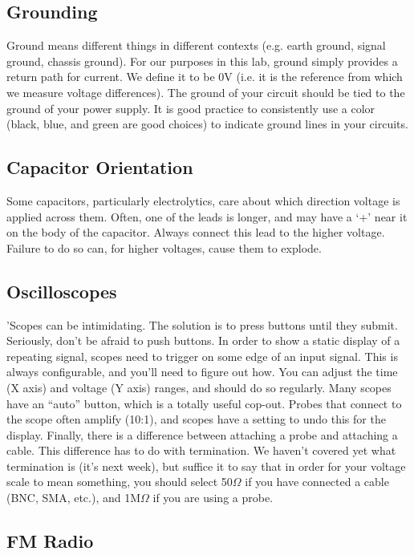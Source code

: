 \documentclass[11pt]{article}
\begin{document}
\subsection*{Grounding}

Ground means different things in different contexts (e.g. earth ground, signal ground,
chassis ground).  For our purposes in
this lab, ground simply provides a return path for current.  We define it to be
0V (i.e. it is the reference from which we measure voltage differences).  The
ground of your circuit should be tied to the ground of your power supply.  It
is good practice to consistently use a color (black, blue, and green are good
choices) to indicate ground lines in your circuits.

\subsection*{Capacitor Orientation}

Some capacitors, particularly electrolytics, care about which direction voltage
is applied across them.  Often, one of the leads is longer, and may have a `+'
near it on the body of the capacitor.  Always connect this lead to the higher voltage.
Failure to do so can, for higher voltages, cause them to explode.

\subsection*{Oscilloscopes}

'Scopes can be intimidating.  The solution is to press buttons until they submit.  Seriously, don't be afraid
to push buttons.  In order to show a static display of a repeating signal, scopes need to trigger on
some edge of an input signal.  This is always configurable, and you'll need to figure out how.  You can
adjust the time (X axis) and voltage (Y axis) ranges, and should do so regularly.  Many scopes have an ``auto''
button, which is a totally useful cop-out.  Probes that connect to the scope often amplify
(10:1), and scopes have a setting to undo this for the display.  Finally, there is a difference between
attaching a probe and attaching a cable.  This difference has to do with termination.  We haven't covered yet
what termination is (it's next week), but suffice it to say that in order for your voltage scale to mean
something, you should select 50$\Omega$ if you have connected a cable (BNC, SMA, etc.), and 1M$\Omega$ if
you are using a probe.

\subsection*{FM Radio}
\end{document}
